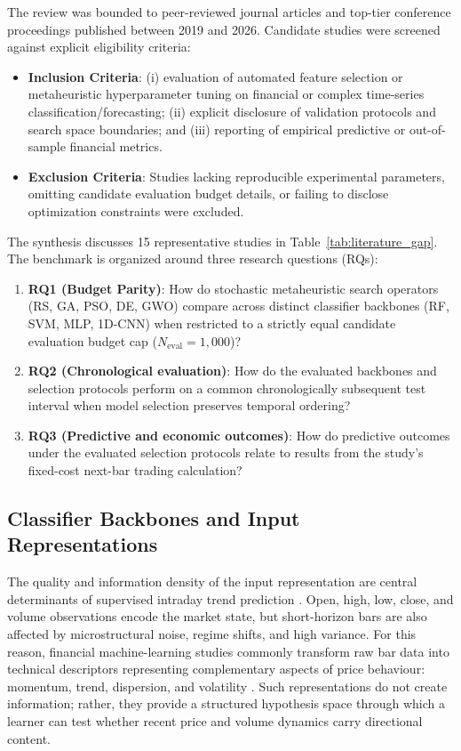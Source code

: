 The review was bounded to peer-reviewed journal articles and top-tier conference proceedings published between 2019 and 2026. Candidate studies were screened against explicit eligibility criteria:
\begin{itemize}
    \item \textbf{Inclusion Criteria}: (i) evaluation of automated feature selection or metaheuristic hyperparameter tuning on financial or complex time-series classification/forecasting; (ii) explicit disclosure of validation protocols and search space boundaries; and (iii) reporting of empirical predictive or out-of-sample financial metrics.
    \item \textbf{Exclusion Criteria}: Studies lacking reproducible experimental parameters, omitting candidate evaluation budget details, or failing to disclose optimization constraints were excluded.
\end{itemize}

The synthesis discusses 15 representative studies in Table~\ref{tab:literature_gap}. The benchmark is organized around three research questions (RQs):
\begin{enumerate}
    \item \textbf{RQ1 (Budget Parity)}: How do stochastic metaheuristic search operators (RS, GA, PSO, DE, GWO) compare across distinct classifier backbones (RF, SVM, MLP, 1D-CNN) when restricted to a strictly equal candidate evaluation budget cap ($N_{\mathrm{eval}} = 1{,}000$)?
    \item \textbf{RQ2 (Chronological evaluation)}: How do the evaluated backbones and selection protocols perform on a common chronologically subsequent test interval when model selection preserves temporal ordering?
    \item \textbf{RQ3 (Predictive and economic outcomes)}: How do predictive outcomes under the evaluated selection protocols relate to results from the study’s fixed-cost next-bar trading calculation?
\end{enumerate}




\FloatBarrier

\subsection{Classifier Backbones and Input Representations}\label{subsec:backbones_features}

The quality and information density of the input representation are central determinants of supervised intraday trend prediction \cite{singh2022feature}. Open, high, low, close, and volume observations encode the market state, but short-horizon bars are also affected by microstructural noise, regime shifts, and high variance. For this reason, financial machine-learning studies commonly transform raw bar data into technical descriptors representing complementary aspects of price behaviour: momentum, trend, dispersion, and volatility \cite{billah2024nca_moving_average, hunter1986exponentially, bollinger1992using}. Such representations do not create information; rather, they provide a structured hypothesis space through which a learner can test whether recent price and volume dynamics carry directional content.

